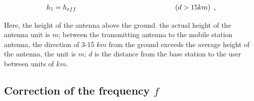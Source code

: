 \documentclass[runningheads,a4paper]{llncs}
\begin{document}
\begin{equation}
\begin{array}{l}
{h_1} = {h_{eff}}{\kern 1pt} {\kern 1pt} {\kern 1pt} {\kern 1pt} {\kern 1pt} {\kern 1pt} {\kern 1pt} {\kern 1pt} {\kern 1pt} {\kern 1pt} {\kern 1pt} {\kern 1pt} {\kern 1pt} {\kern 1pt} {\kern 1pt} {\kern 1pt} {\kern 1pt} {\kern 1pt} {\kern 1pt} {\kern 1pt} {\kern 1pt} {\kern 1pt} {\kern 1pt} {\kern 1pt} {\kern 1pt} {\kern 1pt} {\kern 1pt} {\kern 1pt} {\kern 1pt} {\kern 1pt} {\kern 1pt} {\kern 1pt} {\kern 1pt} {\kern 1pt} {\kern 1pt} {\kern 1pt} {\kern 1pt} {\kern 1pt} {\kern 1pt} {\kern 1pt} {\kern 1pt} {\kern 1pt} {\kern 1pt} {\kern 1pt} {\kern 1pt} {\kern 1pt} {\kern 1pt} {\kern 1pt} {\kern 1pt} {\kern 1pt} {\kern 1pt} {\kern 1pt} {\kern 1pt} {\kern 1pt} {\kern 1pt} {\kern 1pt} {\kern 1pt} {\kern 1pt} {\kern 1pt} {\kern 1pt} {\kern 1pt} {\kern 1pt} {\kern 1pt} {\kern 1pt} {\kern 1pt} {\kern 1pt} {\kern 1pt} {\kern 1pt} {\kern 1pt} {\kern 1pt} {\kern 1pt} {\kern 1pt} {\kern 1pt} {\kern 1pt} {\kern 1pt} {\kern 1pt} {\kern 1pt} {\kern 1pt} {\kern 1pt} {\kern 1pt} {\kern 1pt} {\kern 1pt} {\kern 1pt} {\kern 1pt} {\kern 1pt} {\kern 1pt} {\kern 1pt} {\kern 1pt} {\kern 1pt} {\kern 1pt} {\kern 1pt} {\kern 1pt} {\kern 1pt} {\kern 1pt} {\kern 1pt} {\kern 1pt} {\kern 1pt} {\kern 1pt} {\kern 1pt} {\kern 1pt} {\kern 1pt} {\kern 1pt} {\kern 1pt} {\kern 1pt} {\kern 1pt} {\kern 1pt} {\kern 1pt} {\kern 1pt} {\kern 1pt} {\kern 1pt} {\kern 1pt} {\kern 1pt} {\kern 1pt} {\kern 1pt} {\kern 1pt} {\kern 1pt} {\kern 1pt} {\kern 1pt} {\kern 1pt} {\kern 1pt} {\kern 1pt} {\kern 1pt} {\kern 1pt} {\kern 1pt} {\kern 1pt} {\kern 1pt} {\kern 1pt} {\kern 1pt} {\kern 1pt} {\kern 1pt} {\kern 1pt} {\kern 1pt} {\kern 1pt} {\kern 1pt} {\kern 1pt} {\kern 1pt} {\kern 1pt} {\kern 1pt} {\kern 1pt} {\kern 1pt} {\kern 1pt} {\kern 1pt} (d > 15km)
\end{array}, \label{keurough} \end{equation} 

Here, the height of the antenna above the ground. the actual height of the antenna unit is $m$; between the transmitting antenna to the mobile station antenna, the direction of 3-15 $km$ from the ground exceeds the average height of the antenna, the unit is $m$; $d$ is the distance from the base station to the user between units of $km$.

\subsection{Correction of the frequency $f$}
\end{document}
